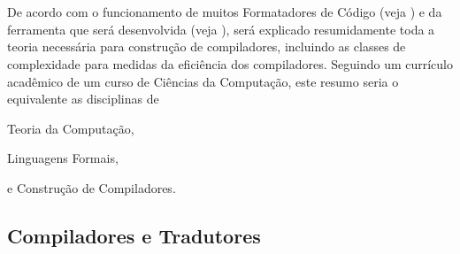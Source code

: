 

\chapter{}

De acordo com o funcionamento de muitos Formatadores de Código (veja ) e
da ferramenta que será desenvolvida (veja ),
será explicado resumidamente toda a teoria necessária para construção de compiladores,
incluindo as classes de complexidade para medidas da eficiência dos compiladores.
Seguindo um currículo acadêmico de um curso de Ciências da Computação,
este resumo seria o equivalente as disciplinas de
\begin{inparaenum}[1)]
\item Teoria da Computação,
\item Linguagens Formais,
\item e
Construção de Compiladores.
\end{inparaenum}


\section{Compiladores e Tradutores}
\label{compiladoresEtradutores}

